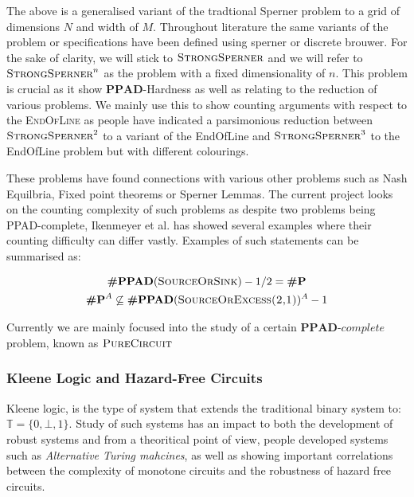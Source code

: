 The above is a generalised variant of the tradtional Sperner problem to
a grid of dimensions $N$ and width of $M$. 
Throughout literature the same variants of the problem or specifications
have been defined using sperner or discrete brouwer. For the sake 
of clarity, we will stick to $\textsc{StrongSperner}$ and
we will refer to $\textsc{StrongSperner}^n$ as the problem
with a fixed dimensionality of $n$. This problem
is crucial as it show $\textbf{PPAD}$-Hardness as well as
relating to the reduction of various problems.
We mainly use this to show counting arguments with respect to the
\textsc{EndOfLine} as people have indicated a parsimonious reduction
between $\textsc{StrongSperner}^2$ to a variant of the EndOfLine
and $\textsc{StrongSperner}^3$ to the EndOfLine problem but with
different colourings.



These problems have found
connections with various other problems such as Nash Equilbria,
Fixed point theorems or Sperner Lemmas. The current project looks
on the counting complexity of such problems as despite two problems
being PPAD-complete, Ikenmeyer et al. has showed several examples where
their counting difficulty can differ vastly. Examples of such statements
can be summarised as:

\begin{gather*}
    \textbf{\#PPAD}(\textsc{SourceOrSink})-1/2  = \textbf{\#P}\\
    \textbf{\#P}^A \not\subseteq \textbf{\#PPAD}(\textsc{SourceOrExcess(2,1)})^A-1
\end{gather*} 


Currently we are mainly focused into the study of a certain 
$\textbf{PPAD}\textit{-complete}$ problem, known as $\textsc{PureCircuit}$

\subsubsection{Kleene Logic and Hazard-Free Circuits}

Kleene logic, is the type of system that extends the traditional %
binary system to: $\mathbb{T} = \{0, \bot,1 \}$. 
Study of such systems has an impact to both
the development of robust systems and from a theoritical point of view,
people developed systems such as \textit{Alternative Turing mahcines}, as well as
showing important correlations between the complexity of monotone circuits
and the robustness of hazard free circuits. 

